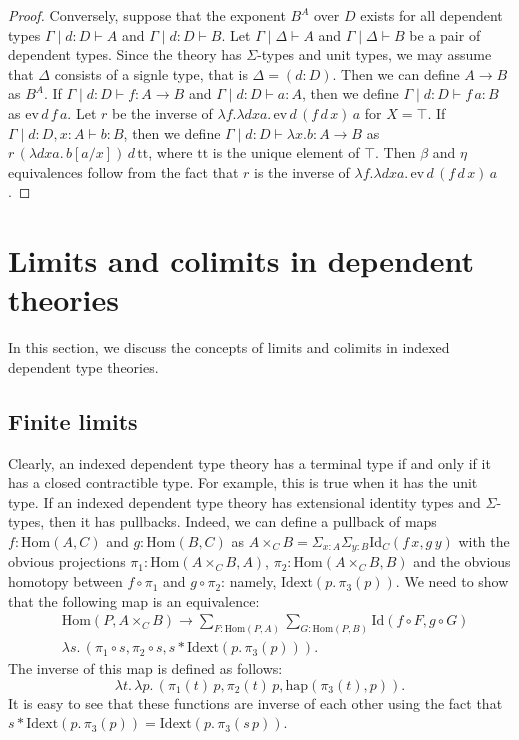 \documentclass[reqno]{amsart}
\theoremstyle{definition}
\theoremstyle{remark}
\newcommand{\ob}{}
\newcommand{\fs}[1]{\mathrm{#1}}
\newcommand{\Hom}{\fs{Hom}}
\newcommand{\Id}{\fs{Id}}
\numberwithin{figure}{section}
\begin{document}
\begin{proof}
Conversely, suppose that the exponent $B^A$ over $D$ exists for all dependent types $\Gamma \mid d : D \vdash A \ob$ and $\Gamma \mid d : D \vdash B \ob$.
Let $\Gamma \mid \Delta \vdash A \ob$ and $\Gamma \mid \Delta \vdash B \ob$ be a pair of dependent types.
Since the theory has $\Sigma$-types and unit types, we may assume that $\Delta$ consists of a signle type, that is $\Delta = (d : D)$.
Then we can define $A \to B$ as $B^A$.
If $\Gamma \mid d : D \vdash f : A \to B$ and $\Gamma \mid d : D \vdash a : A$, then we define $\Gamma \mid d : D \vdash f\,a : B$ as $\fs{ev}\,d\,f\,a$.
Let $r$ be the inverse of $\lambda f. \lambda d x a.\,\fs{ev}\,d\,(f\,d\,x)\,a$ for $X = \top$.
If $\Gamma \mid d : D, x : A \vdash b : B$, then we define $\Gamma \mid d : D \vdash \lambda x.b : A \to B$ as $r\,(\lambda d x a.\,b[a/x])\,d\,\fs{tt}$, where $\fs{tt}$ is the unique element of $\top$.
Then $\beta$ and $\eta$ equivalences follow from the fact that $r$ is the inverse of $\lambda f. \lambda d x a.\,\fs{ev}\,d\,(f\,d\,x)\,a$.
\end{proof}

\section{Limits and colimits in dependent theories}

In this section, we discuss the concepts of limits and colimits in indexed dependent type theories.

\subsection{Finite limits}

Clearly, an indexed dependent type theory has a terminal type if and only if it has a closed contractible type.
For example, this is true when it has the unit type.
If an indexed dependent type theory has extensional identity types and $\Sigma$-types, then it has pullbacks.
Indeed, we can define a pullback of maps $f : \Hom(A,C)$ and $g : \Hom(B,C)$ as $A \times_C B = \Sigma_{x : A} \Sigma_{y : B} \Id_C(f\,x,g\,y)$
with the obvious projections $\pi_1 : \Hom(A \times_C B, A)$, $\pi_2 : \Hom(A \times_C B, B)$ and the obvious homotopy between $f \circ \pi_1$ and $g \circ \pi_2$: namely, $\fs{Idext}(p.\,\pi_3(p))$.
We need to show that the following map is an equivalence:
\begin{align*}
& \Hom(P, A \times_C B) \to \sum_{F : \Hom(P,A)} \sum_{G : \Hom(P,B)} \Id(f \circ F, g \circ G) \\
& \lambda s.\,(\pi_1 \circ s, \pi_2 \circ s, s * \fs{Idext}(p.\,\pi_3(p))).
\end{align*}
The inverse of this map is defined as follows:
\[ \lambda t.\,\lambda p.\,(\pi_1(t)\,p, \pi_2(t)\,p, \fs{hap}(\pi_3(t),p)). \]
It is easy to see that these functions are inverse of each other using the fact that $s * \fs{Idext}(p.\,\pi_3(p)) = \fs{Idext}(p.\,\pi_3(s\,p))$.
\end{document}
